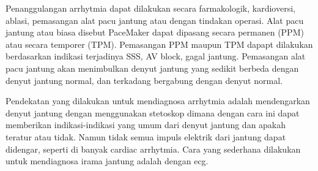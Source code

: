 Penanggulangan arrhytmia dapat dilakukan secara farmakologik, kardioversi,
ablasi, pemasangan alat pacu jantung atau dengan tindakan operasi. Alat pacu
jantung atau biasa disebut PaceMaker dapat dipasang secara permanen (PPM) atau
secara temporer (TPM). Pemasangan PPM maupun TPM dapapt dilakukan berdasarkan
indikasi terjadinya SSS,  AV block, gagal jantung. Pemasangan alat pacu jantung
akan menimbulkan denyut jantung yang sedikit berbeda dengan denyut jantung
normal, dan terkadang bergabung dengan denyut normal.

 
Pendekatan yang dilakukan untuk mendiagnosa \gls{arrhytmia} adalah
mendengarkan denyut jantung dengan menggunakan stetoskop dimana dengan cara ini
dapat memberikan indikasi-indikasi yang umum dari denyut jantung dan apakah
teratur atau tidak. Namun tidak semua impuls elektrik dari jantung dapat
didengar, seperti di banyak cardiac arrhytmia. Cara yang sederhana dilakukan
untuk mendiagnosa irama jantung adalah dengan \gls{ecg}.




